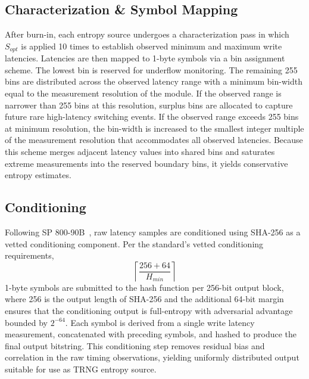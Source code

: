 \subsection{Characterization \& Symbol Mapping}
After burn-in, each entropy source undergoes a characterization pass in
which $S_{opt}$ is applied 10 times to establish observed minimum and
maximum write latencies. Latencies are then mapped to 1-byte symbols via
a bin assignment scheme. The lowest bin is reserved for underflow
monitoring. The remaining 255 bins are distributed across the observed
latency range with a minimum bin-width equal to the measurement
resolution of the module. If the observed range is narrower than 255
bins at this resolution, surplus bins are allocated to capture future
rare high-latency switching events. If the observed range exceeds 255
bins at minimum resolution, the bin-width is increased to the smallest
integer multiple of the measurement resolution that accommodates all
observed latencies. Because this scheme merges adjacent latency values
into shared bins and saturates extreme measurements into the reserved
boundary bins, it yields conservative entropy estimates.

\subsection{Conditioning}
Following SP 800-90B~\cite{nist90b}, raw latency samples are conditioned
using SHA-256 as a vetted conditioning component. Per the standard's
vetted conditioning requirements,
\begin{equation}
	\left\lceil\frac{256 + 64}{H_{min}}\right\rceil
\end{equation}
1-byte symbols are submitted to the hash function per 256-bit output block, where 256 is the output length of SHA-256 and the additional 64-bit margin ensures that the conditioning output is full-entropy with adversarial advantage bounded by $2^{-64}$. Each symbol is derived from a single write latency measurement, concatenated with preceding symbols, and hashed to produce the final output bitstring. This conditioning step removes residual bias and correlation in the raw timing observations, yielding uniformly distributed output suitable for use as TRNG entropy source.

